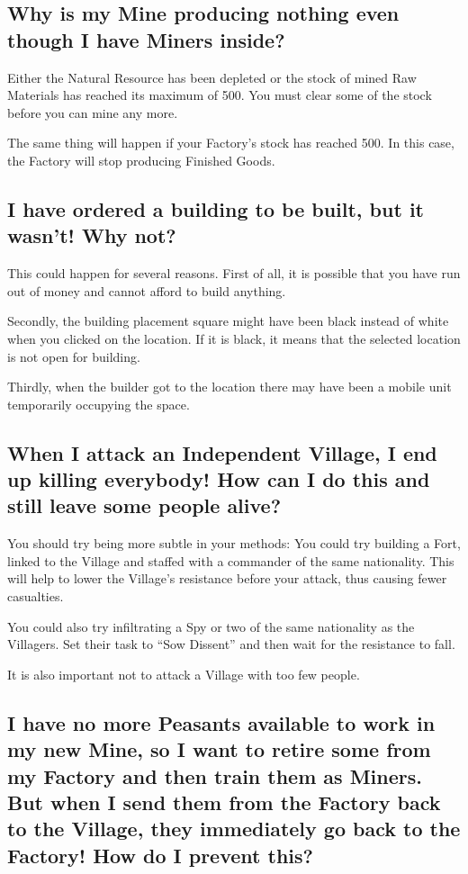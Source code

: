 \subsection{Why is my Mine producing nothing even though I have Miners inside?}

Either the Natural Resource has been depleted or the stock of mined Raw Materials has reached its maximum of 500. You must clear some of the stock before you can mine any more.

The same thing will happen if your Factory’s stock has reached 500. In this case, the Factory will stop producing Finished Goods.

\subsection{I have ordered a building to be built, but it wasn’t! Why not?}

This could happen for several reasons. First of all, it is possible that you have run out of money and cannot afford to build anything.

Secondly, the building placement square might have been black instead of white when you clicked on the location. If it is black, it means that the selected location is not open for building.


Thirdly, when the builder got to the location there may have been a mobile unit temporarily occupying the space.

\subsection{When I attack an Independent Village, I end up killing everybody! How can I do this and still leave some people alive?}

You should try being more subtle in your methods: You could try building a Fort, linked to the Village and staffed with a commander of the same nationality. This will help to lower the Village’s resistance before your attack, thus causing fewer casualties.

You could also try infiltrating a Spy or two of the same nationality as the Villagers. Set their task to “Sow Dissent” and then wait for the resistance to fall.

It is also important not to attack a Village with too few people.

\subsection{I have no more Peasants available to work in my new Mine, so I want to retire some from my Factory and then train them as Miners. But when I send them from the Factory back to the Village, they immediately go back to the Factory! How do I prevent this?}

